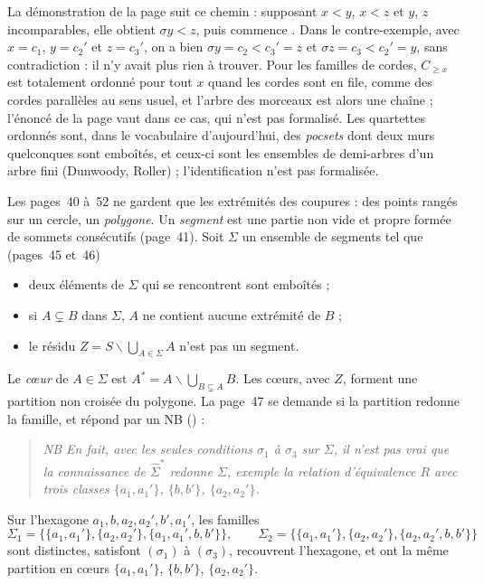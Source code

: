 \begin{remarque}
La démonstration de la page suit ce chemin : supposant $x < y$, $x < z$ et $y$, $z$ incomparables, elle obtient $\sigma y < z$, puis commence . Dans le contre-exemple, avec $x = c_1$, $y = c_2'$ et $z = c_3'$, on a bien $\sigma y = c_2 < c_3' = z$ et $\sigma z = c_3 < c_2' = y$, sans contradiction : il n'y avait plus rien à trouver. Pour les familles de cordes, $C_{\geqslant x}$ est totalement ordonné pour tout $x$ quand les cordes sont en file, comme des cordes parallèles au sens usuel, et l'arbre des morceaux est alors une chaîne ; l'énoncé de la page vaut dans ce cas, qui n'est pas formalisé. Les quartettes ordonnés sont, dans le vocabulaire d'aujourd'hui, des \emph{pocsets} dont deux murs quelconques sont emboîtés, et ceux-ci sont les ensembles de demi-arbres d'un arbre fini (Dunwoody, Roller) ; l'identification n'est pas formalisée.
\end{remarque}

Les pages~40 à~52 ne gardent que les extrémités des coupures : des points rangés sur un cercle, un \emph{polygone}. Un \emph{segment} est une partie non vide et propre formée de sommets consécutifs (page~41). Soit $\Sigma$ un ensemble de segments tel que (pages~45 et~46)
\begin{itemize}
\item[($\sigma_1$)] deux éléments de $\Sigma$ qui se rencontrent sont emboîtés ;
\item[($\sigma_2$)] si $A \subsetneq B$ dans $\Sigma$, $A$ ne contient aucune extrémité de $B$ ;
\item[($\sigma_3$)] le résidu $Z = S \smallsetminus \bigcup_{A \in \Sigma} A$ n'est pas un segment.
\end{itemize}
Le \emph{cœur} de $A \in \Sigma$ est $A^* = A \smallsetminus \bigcup_{B \subsetneq A} B$. Les cœurs, avec $Z$, forment une partition non croisée du polygone. La page~47 se demande si la partition redonne la famille, et répond par un NB () :
\begin{quote}
\emph{NB En fait, avec les seules conditions $\sigma_1$ à $\sigma_3$ sur $\Sigma$, il n'est pas vrai que la connaissance de $\widehat{\Sigma}^*$ redonne $\Sigma$, exemple la relation d'équivalence $R$ avec trois classes $\{a_1, a_1'\}$, $\{b, b'\}$, $\{a_2, a_2'\}$.}
\end{quote}

\begin{enonce}
Sur l'hexagone $a_1, b, a_2, a_2', b', a_1'$, les familles
\[
\Sigma_1 = \bigl\{\{a_1, a_1'\}, \{a_2, a_2'\}, \{a_1, a_1', b, b'\}\bigr\}, \qquad \Sigma_2 = \bigl\{\{a_1, a_1'\}, \{a_2, a_2'\}, \{a_2, a_2', b, b'\}\bigr\}
\]
sont distinctes, satisfont $(\sigma_1)$ à $(\sigma_3)$, recouvrent l'hexagone, et ont la même partition en cœurs $\{a_1, a_1'\}$, $\{b, b'\}$, $\{a_2, a_2'\}$.
\end{enonce}

